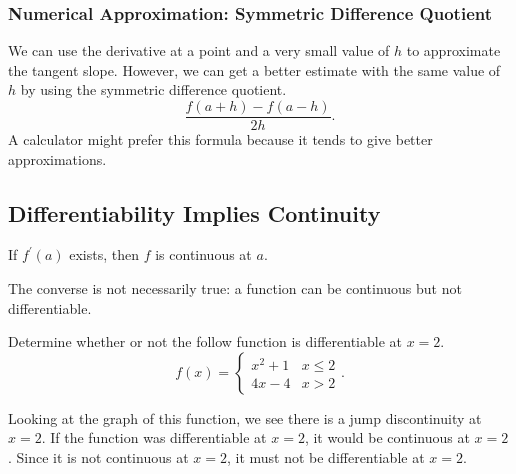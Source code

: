 \subsubsection{Numerical Approximation: Symmetric Difference Quotient}
We can use the derivative at a point and a very small value of $h$ to approximate the tangent slope.
However, we can get a better estimate with the same value of $h$ by using the symmetric difference quotient.
\begin{equation*}
	\frac{f(a+h)-f(a-h)}{2h}.
\end{equation*}
\noindent
A calculator might prefer this formula because it tends to give better approximations.

\subsection{Differentiability Implies Continuity}
\begin{theorem}
	If $f^\prime(a)$ exists, then $f$ is continuous at $a$.
\end{theorem}
\noindent
The converse is not necessarily true: a function can be continuous but not differentiable.

\begin{example}
	Determine whether or not the follow function is differentiable at $x=2$.
	\begin{equation*}
		f(x) = \begin{cases}
			x^2 + 1 & x \leq 2 \\
			4x-4 & x > 2
		\end{cases}.
	\end{equation*}
\end{example}
Looking at the graph of this function, we see there is a jump discontinuity at $x=2$.
If the function was differentiable at $x=2$, it would be continuous at $x=2$.
Since it is not continuous at $x=2$, it must not be differentiable at $x=2$.

